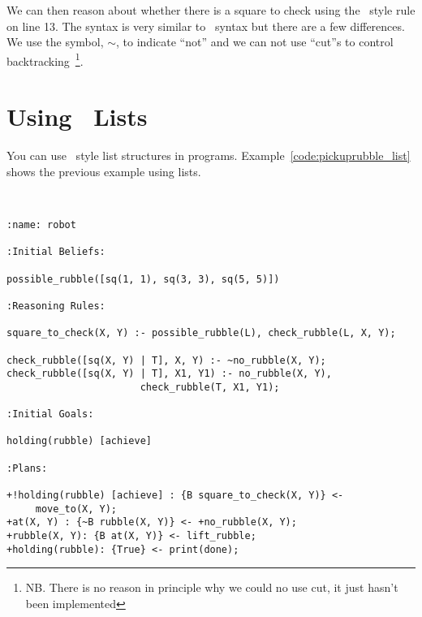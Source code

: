 We can then reason about whether there is a square to check using the \prolog\ style rule on line 13.  The syntax is very similar to \prolog\ syntax but there are a few differences.  We use the symbol, $\sim$, to indicate ``not'' and we can not use ``cut''s to control backtracking~\footnote{NB.  There is no reason in principle why we could no use cut, it just hasn't been implemented}.

\section{Using \prolog\ Lists}
You can use \prolog\ style list structures in \gwendolen programs.  Example~\ref{code:pickuprubble_list} shows the previous example using lists.
\begin{ourexample}
\label{code:pickuprubble_list} \quad \\
\begin{lstlisting}[basicstyle=\sffamily,style=easslisting,language=Gwendolen]
:name: robot

:Initial Beliefs:

possible_rubble([sq(1, 1), sq(3, 3), sq(5, 5)])

:Reasoning Rules:

square_to_check(X, Y) :- possible_rubble(L), check_rubble(L, X, Y);

check_rubble([sq(X, Y) | T], X, Y) :- ~no_rubble(X, Y);
check_rubble([sq(X, Y) | T], X1, Y1) :- no_rubble(X, Y), 
                       check_rubble(T, X1, Y1);

:Initial Goals:

holding(rubble) [achieve]

:Plans:

+!holding(rubble) [achieve] : {B square_to_check(X, Y)} <-
     move_to(X, Y);
+at(X, Y) : {~B rubble(X, Y)} <- +no_rubble(X, Y);
+rubble(X, Y): {B at(X, Y)} <- lift_rubble;
+holding(rubble): {True} <- print(done);
\end{lstlisting}
\end{ourexample}

